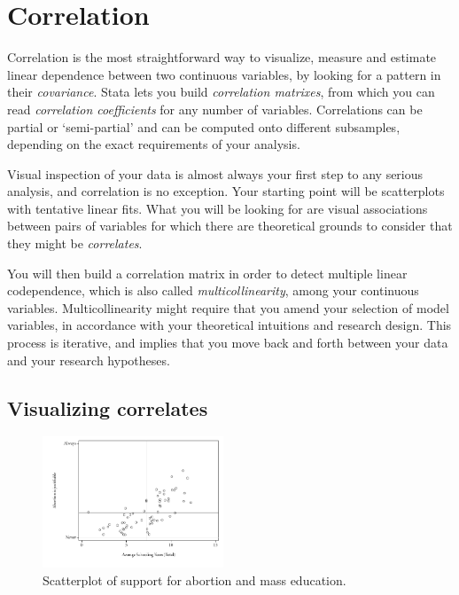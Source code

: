 %
%
%
\section{Correlation}%
  \label{sec:correlation}

Correlation is the most straightforward way to visualize, measure and estimate linear dependence between two continuous variables, by looking for a pattern in their \emph{covariance}. Stata lets you build \emph{correlation matrixes}, from which you can read \emph{correlation coefficients} for any number of variables. Correlations can be partial or `semi-partial' and can be computed onto different subsamples, depending on the exact requirements of your analysis.%

Visual inspection of your data is almost always your first step to any serious analysis, and correlation is no exception. Your starting point will be scatterplots with tentative linear fits. What you will be looking for are visual associations between pairs of variables for which there are theoretical grounds to consider that they might be \emph{correlates}.%

You will then build a correlation matrix in order to detect multiple linear codependence, which is also called \emph{multicollinearity}, among your continuous variables. Multicollinearity might require that you amend your selection of model variables, in accordance with your theoretical intuitions and research design. This process is iterative, and implies that you move back and forth between your data and your research hypotheses.%


  \subsection{Visualizing correlates}%

  \begin{figure}
    \begin{center}
      \includegraphics[width=0.48\textwidth]{images/abortion_sc_means.pdf}
    \end{center}
    	\caption[Linear correlation]{\label{fig:correlation_scatterplot}
  	Scatterplot of support for abortion and mass education.\\
  	\mlines{} }
  \end{figure}%

